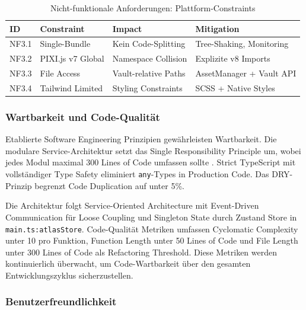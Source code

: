 \begin{table}[htbp]
	\centering
	\small
	\caption{Nicht-funktionale Anforderungen: Plattform-Constraints}
	\label{tab:nicht-funktionale-anforderungen-plattform}
	\begin{tabularx}{\textwidth}{lXXX}
		\toprule
		\textbf{ID} & \textbf{Constraint} & \textbf{Impact}      & \textbf{Mitigation}           \\
		\midrule
		NF3.1       & Single-Bundle       & Kein Code-Splitting  & Tree-Shaking, Monitoring      \\
		NF3.2       & PIXI.js v7 Global   & Namespace Collision  & Explizite v8 Imports          \\
		NF3.3       & File Access         & Vault-relative Paths & AssetManager + Vault \ac{API} \\
		NF3.4       & Tailwind Limited    & Styling Constraints  & \ac{SCSS} + Native Styles     \\
		\bottomrule
	\end{tabularx}
\end{table}

\subsubsection{Wartbarkeit und Code-Qualität}

Etablierte Software Engineering Prinzipien gewährleisten Wartbarkeit. Die modulare Service-Architektur setzt das Single Responsibility Principle um, wobei jedes Modul maximal 300 Lines of Code umfassen sollte \autocite[S. 49-50]{ShvetsDesignPatterns,ESLintMaxLines2024}. Strict TypeScript mit vollständiger Type Safety eliminiert \texttt{any}-Types in Production Code. Das DRY-Prinzip begrenzt Code Duplication auf unter 5\%.

Die Architektur folgt Service-Oriented Architecture mit Event-Driven Communication für Loose Coupling und Singleton State durch Zustand Store in \texttt{main.ts:atlasStore}. Code-Qualität Metriken umfassen Cyclomatic Complexity unter 10 pro Funktion, Function Length unter 50 Lines of Code und File Length unter 300 Lines of Code als Refactoring Threshold. Diese Metriken werden kontinuierlich überwacht, um Code-Wartbarkeit über den gesamten Entwicklungszyklus sicherzustellen.

\subsubsection{Benutzerfreundlichkeit}

